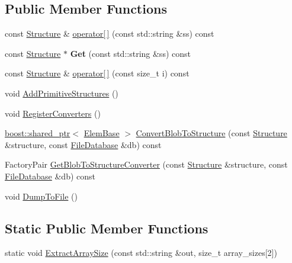 \subsection*{Public Member Functions}
\begin{DoxyCompactItemize}
\item 
const \hyperlink{class_assimp_1_1_blender_1_1_structure}{Structure} \& \hyperlink{class_assimp_1_1_blender_1_1_d_n_a_a1bb8e3885f74a49fb6475f25bebe46ac}{operator\mbox{[}$\,$\mbox{]}} (const std\+::string \&ss) const 
\item 
\hypertarget{class_assimp_1_1_blender_1_1_d_n_a_a8b3b2a00197c6e752e2cd41220ba61f3}{const \hyperlink{class_assimp_1_1_blender_1_1_structure}{Structure} $\ast$ {\bfseries Get} (const std\+::string \&ss) const }\label{class_assimp_1_1_blender_1_1_d_n_a_a8b3b2a00197c6e752e2cd41220ba61f3}

\item 
const \hyperlink{class_assimp_1_1_blender_1_1_structure}{Structure} \& \hyperlink{class_assimp_1_1_blender_1_1_d_n_a_a0f2c5fc6a6b0785ff75bbb69c7c7d56e}{operator\mbox{[}$\,$\mbox{]}} (const size\+\_\+t i) const 
\item 
void \hyperlink{class_assimp_1_1_blender_1_1_d_n_a_a578544837e6ca3c1ebaf25a188b829f4}{Add\+Primitive\+Structures} ()
\item 
void \hyperlink{class_assimp_1_1_blender_1_1_d_n_a_a540b5e884667cc220b64b5b5c4a104ba}{Register\+Converters} ()
\item 
\hyperlink{classboost_1_1shared__ptr}{boost\+::shared\+\_\+ptr}$<$ \hyperlink{struct_assimp_1_1_blender_1_1_elem_base}{Elem\+Base} $>$ \hyperlink{class_assimp_1_1_blender_1_1_d_n_a_a2851d3c3121344f8dd9991606201df96}{Convert\+Blob\+To\+Structure} (const \hyperlink{class_assimp_1_1_blender_1_1_structure}{Structure} \&structure, const \hyperlink{class_assimp_1_1_blender_1_1_file_database}{File\+Database} \&db) const 
\item 
Factory\+Pair \hyperlink{class_assimp_1_1_blender_1_1_d_n_a_a34e60b1bc15c5ba8ecefe23269b037be}{Get\+Blob\+To\+Structure\+Converter} (const \hyperlink{class_assimp_1_1_blender_1_1_structure}{Structure} \&structure, const \hyperlink{class_assimp_1_1_blender_1_1_file_database}{File\+Database} \&db) const 
\item 
void \hyperlink{class_assimp_1_1_blender_1_1_d_n_a_af191623a02c17eaffd583b346b0b226e}{Dump\+To\+File} ()
\end{DoxyCompactItemize}
\subsection*{Static Public Member Functions}
\begin{DoxyCompactItemize}
\item 
static void \hyperlink{class_assimp_1_1_blender_1_1_d_n_a_a784740602652bb0e557c3d7e3bd337d2}{Extract\+Array\+Size} (const std\+::string \&out, size\+\_\+t array\+\_\+sizes\mbox{[}2\mbox{]})
\end{DoxyCompactItemize}
